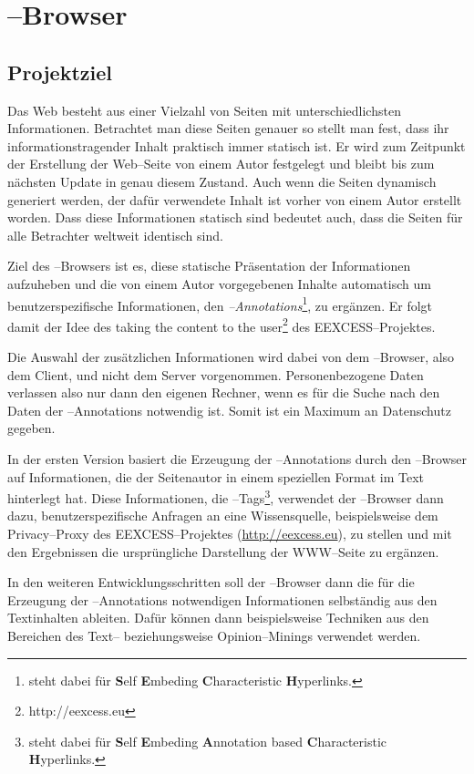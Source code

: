 \chapter{\SECH--Browser}

\section{Projektziel}
Das Web besteht aus einer Vielzahl von Seiten mit unterschiedlichsten
Informationen. Betrachtet man diese Seiten genauer so stellt man fest,
dass ihr informationstragender Inhalt praktisch immer statisch ist.
Er wird zum Zeitpunkt der Erstellung der Web--Seite von einem Autor
festgelegt und bleibt bis zum nächsten Update in genau diesem
Zustand. Auch wenn die Seiten dynamisch generiert werden, der dafür
verwendete Inhalt ist vorher von einem Autor erstellt worden. Dass
diese Informationen statisch sind bedeutet auch, dass die Seiten für
alle Betrachter weltweit identisch sind.

Ziel des \SECH--Browsers ist es, diese statische Präsentation der
Informationen aufzuheben und die von einem Autor vorgegebenen Inhalte
automatisch um benutzerspezifische Informationen, den
\emph{\SECH--Annotations}\footnote{\SECH steht dabei für \textbf{S}elf
  \textbf{E}mbeding \textbf{C}haracteristic \textbf{H}yperlinks.}, zu
ergänzen. Er folgt damit der Idee des \glqq taking the content to the
user\grqq\footnote{http://eexcess.eu} des EEXCESS--Projektes.

Die Auswahl der zusätzlichen Informationen wird dabei von dem
\SECH--Browser, also dem Client, und nicht dem Server
vorgenommen. Personenbezogene Daten verlassen also nur dann den
eigenen Rechner, wenn es für die Suche nach den Daten der
\SECH--Annotations notwendig ist. Somit ist ein Maximum an
Datenschutz gegeben.

In der ersten Version basiert die Erzeugung der \SECH--Annotations
durch den \SECH--Browser auf Informationen, die der Seitenautor in
einem speziellen Format im Text hinterlegt hat. Diese Informationen,
die \SEACH--Tags\footnote{\SEACH steht dabei für \textbf{S}elf
  \textbf{E}mbeding \textbf{A}nnotation based \textbf{C}haracteristic \textbf{H}yperlinks.}, verwendet der \SECH--Browser dann dazu, benutzerspezifische
Anfragen an eine Wissensquelle, beispielsweise dem Privacy--Proxy des
EEXCESS--Projektes (\url{http://eexcess.eu}), zu stellen und mit den
Ergebnissen die ursprüngliche Darstellung der WWW--Seite zu
ergänzen. 

In den weiteren Entwicklungsschritten soll der \SECH--Browser dann die
für die Erzeugung der \SECH--Annotations notwendigen Informationen
selbständig aus den Textinhalten ableiten. Dafür können dann
beispielsweise Techniken aus den Bereichen des Text-- beziehungsweise
Opinion--Minings verwendet werden.

